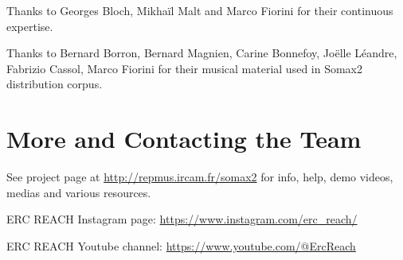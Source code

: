 \vspace{5mm}



\vspace{5mm}

\noindent Thanks to Georges Bloch, Mikhaïl Malt and Marco Fiorini for their continuous expertise.

\vspace{5mm}

\noindent Thanks to Bernard Borron, Bernard Magnien, Carine Bonnefoy, Joëlle Léandre, Fabrizio Cassol, Marco Fiorini for their musical material used in Somax2 distribution corpus.

\section{More and Contacting the Team}

See project page at \url{http://repmus.ircam.fr/somax2} for info, help, demo videos, medias and various resources.

ERC REACH Instagram page: \url{https://www.instagram.com/erc_reach/}

ERC REACH Youtube channel: \url{https://www.youtube.com/@ErcReach}
